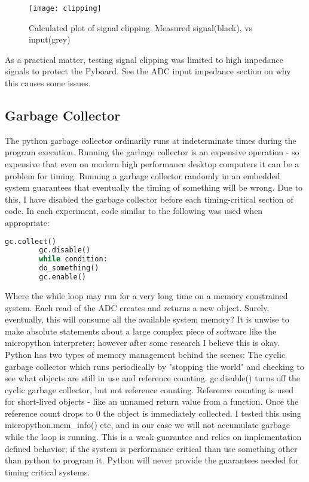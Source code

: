 \documentclass[11pt]{article}
\begin{document}
{	\begin{figure}[H]
		\centering
		\texttt{[image: clipping]}
		\caption{Calculated plot of signal clipping. Measured signal(black), vs input(grey)}
		\label{fig:adc_clipping}
		\vspace{15px}
	\end{figure}
	
	As a practical matter, testing signal clipping was limited to high impedance signals to protect the Pyboard. See the ADC input impedance section on why this causes some issues. 
	
	\subsection{Garbage Collector}
	The python garbage collector ordinarily runs at indeterminate times during the program execution. Running the garbage collector is an expensive operation - so expensive that even on modern high performance desktop computers it can be a problem for timing. Running a garbage collector randomly in an embedded system guarantees that eventually the timing of something will be wrong. Due to this, I have disabled the garbage collector before each timing-critical section of code.
	In each experiment, code similar to the following was used when appropriate:
	\begin{lstlisting}[language=Python]
		gc.collect()
		gc.disable()
		while condition:
		do_something()
		gc.enable()
	\end{lstlisting}
	Where the while loop may run for a very long time on a memory constrained system. Each read of the ADC creates and returns a new object. Surely, eventually, this will consume all the available system memory? It is unwise to make absolute statements about a large complex piece of software like the micropython interpreter; however after some research I believe this is okay. 
	Python has two types of memory management behind the scenes: The cyclic garbage collector which runs periodically by "stopping the world" and checking to see what objects are still in use and reference counting. gc.disable() turns off the cyclic garbage collector, but not reference counting. 
	Reference counting is used for short-lived objects - like an unnamed return value from a function. Once the reference count drops to 0 the object is immediately collected. I tested this using micropython.mem\_info() etc, and in our case we will not accumulate garbage while the loop is running. This is a weak guarantee and relies on implementation defined behavior; if the system is performance critical than use something other than python to program it. Python will never provide the guarantees needed for timing critical systems.
	
}
\end{document}
